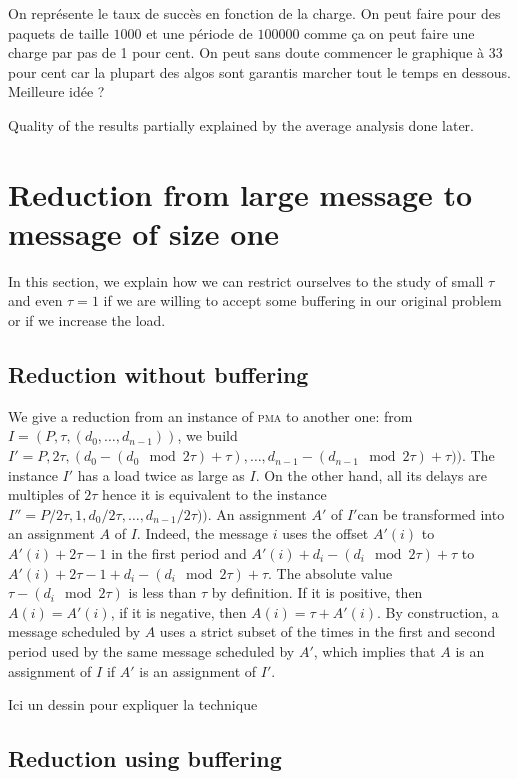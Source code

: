 \documentclass[10pt, conference, letterpaper]{IEEEtran}
\newcommand\pma{\textsc{pma}\xspace}
\begin{document}
On représente le taux de succès en fonction de la charge. On peut faire
pour des paquets de taille $1000$ et une période de $100 000$ comme ça on
peut faire une charge par pas de 1 pour cent. On peut sans doute commencer
le graphique à 33 pour cent car la plupart des algos sont garantis marcher 
tout le temps en dessous. 
Meilleure idée ? 

Quality of the results partially explained by the average analysis done later.
 

\section{Reduction from large message to message of size one}

In this section, we explain how we can restrict ourselves to the study 
of small $\tau$ and even $\tau = 1$ if we are willing to accept some 
buffering in our original problem or if we increase the load.


\subsection{Reduction without buffering}

We give a reduction from an instance of \pma to another one:
from $I = (P,\tau,(d_{0},\dots,d_{n-1}))$, we build $I' = P, 2\tau, (d_{0}-(d_{0}\mod 2\tau)+ \tau),\dots,d_{n-1} - (d_{n-1} \mod 2\tau) + \tau))$. The instance $I'$ has a load twice as large as $I$.
On the other hand, all its delays are multiples of $2\tau$ hence it is equivalent to the instance  $I'' = P/2\tau, 1,d_{0}/ 2\tau,\dots,d_{n-1} /2\tau))$. An assignment $A'$ of $I'$can be transformed into an assignment $A$ of $I$. Indeed, the message $i$ uses the offset $A'(i)$
to $A'(i) + 2\tau -1$ in the first period and $A'(i) + d_{i} - (d_{i} \mod 2\tau) + \tau$ to $A'(i) + 2\tau -1+ d_{i} - (d_{i} \mod 2\tau)  + \tau$.  The absolute value $\tau - (d_{i} \mod 2\tau)$ is less than $\tau$ by definition. If it is positive, then $A(i) = A'(i)$, if it is negative, then $A(i) = \tau + A'(i)$. By construction, a message scheduled by $A$ uses a strict subset of the times in the first and second period used by the same message scheduled by $A'$, which implies that $A$ is an assignment of $I$ if $A'$ is an assignment of $I'$. 

Ici un dessin pour expliquer la technique


\subsection{Reduction  using buffering}
\end{document}

